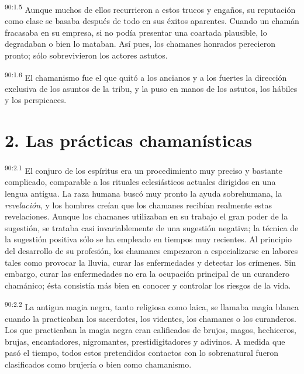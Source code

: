 \documentclass[twoside, 11pt]{book}
\begin{document}
\par
\textsuperscript{90:1.5} Aunque muchos de ellos recurrieron a estos trucos y engaños, su reputación como clase se basaba después de todo en sus éxitos aparentes. Cuando un chamán fracasaba en su empresa, si no podía presentar una coartada plausible, lo degradaban o bien lo mataban. Así pues, los chamanes honrados perecieron pronto; sólo sobrevivieron los actores astutos.

\par
\textsuperscript{90:1.6} El chamanismo fue el que quitó a los ancianos y a los fuertes la dirección exclusiva de los asuntos de la tribu, y la puso en manos de los astutos, los hábiles y los perspicaces.

\section*{2. Las prácticas chamanísticas}
\par
\textsuperscript{90:2.1} El conjuro de los espíritus era un procedimiento muy preciso y bastante complicado, comparable a los rituales eclesiásticos actuales dirigidos en una lengua antigua. La raza humana buscó muy pronto la ayuda sobrehumana, la \textit{revelación}, y los hombres creían que los chamanes recibían realmente estas revelaciones. Aunque los chamanes utilizaban en su trabajo el gran poder de la sugestión, se trataba casi invariablemente de una sugestión negativa; la técnica de la sugestión positiva sólo se ha empleado en tiempos muy recientes. Al principio del desarrollo de su profesión, los chamanes empezaron a especializarse en labores tales como provocar la lluvia, curar las enfermedades y detectar los crímenes. Sin embargo, curar las enfermedades no era la ocupación principal de un curandero chamánico; ésta consistía más bien en conocer y controlar los riesgos de la vida.

\par
\textsuperscript{90:2.2} La antigua magia negra, tanto religiosa como laica, se llamaba magia blanca cuando la practicaban los sacerdotes, los videntes, los chamanes o los curanderos. Los que practicaban la magia negra eran calificados de brujos, magos, hechiceros, brujas, encantadores, nigromantes, prestidigitadores y adivinos. A medida que pasó el tiempo, todos estos pretendidos contactos con lo sobrenatural fueron clasificados como brujería o bien como chamanismo.
\end{document}
